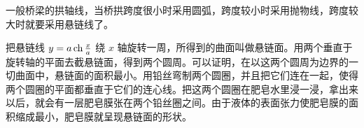 一般桥梁的拱轴线，当桥拱跨度很小时采用圆弧，跨度较小时采用抛物线，跨度较大时就要采用悬链线了。

把悬链线 $y = a \operatorname{ch} \frac{x}{a}$ 绕 $x$ 轴旋转一周，所得到的曲面叫做悬链面。用两个垂直于旋转轴的平面去截悬链面，得到两个圆周。可以证明，在以这两个圆周为边界的一切曲面中，悬链面的面积最小。用铅丝弯制两个圆圈，并且把它们连在一起，使得两个圆圈的平面都垂直于它们的连心线。把这两个圆圈在肥皂水里浸一浸，拿出来以后，就会有一层肥皂膜张在两个铅丝圈之间。由于液体的表面张力使肥皂膜的面积缩成最小，肥皂膜就呈现悬链面的形状。
